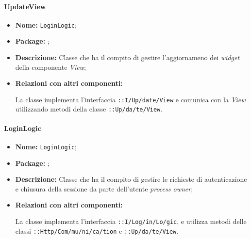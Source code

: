 \paragraph{UpdateView}
\begin{flushleft}
\begin{itemize}
\item \textbf{Nome:} \texttt{LoginLogic};
\item \textbf{Package:} \texttt{\logicAdmin{}};
\item \textbf{Descrizione:} Classe che ha il compito di gestire l'aggiornameno dei \textit{widget} della componente \textit{View};
\item \textbf{Relazioni con altri componenti:}
\begin{sloppypar}
La classe implementa l'interfaccia \texttt{\iLogicAdmin{}::I\fshyp{}Up\fshyp{}date\fshyp{}View} e comunica con la \textit{View} utilizzando metodi della classe \texttt{\viewAdmin{}::Up\fshyp{}da\fshyp{}te\fshyp{}View}.
\end{sloppypar}
\end{itemize}
\end{flushleft}

\paragraph{LoginLogic}
\begin{flushleft}
\begin{itemize}
\item \textbf{Nome:} \texttt{LoginLogic};
\item \textbf{Package:} \texttt{\logicAdmin{}};
\item \textbf{Descrizione:} Classe che ha il compito di gestire le richieste di autenticazione e chiusura della sessione da parte dell'utente \textit{process owner};
\item \textbf{Relazioni con altri componenti:}
\begin{sloppypar}
La classe implementa l'interfaccia \texttt{\iLogicAdmin{}::I\fshyp{}Log\fshyp{}in\fshyp{}Lo\fshyp{}gic}, e utilizza metodi delle classi \texttt{\serverCommunication{}::Http\fshyp{}Com\fshyp{}mu\fshyp{}ni\fshyp{}ca\fshyp{}tion} e \texttt{\logicAdmin{}::Up\fshyp{}da\fshyp{}te\fshyp{}View}.
\end{sloppypar}
\end{itemize}
\end{flushleft}

